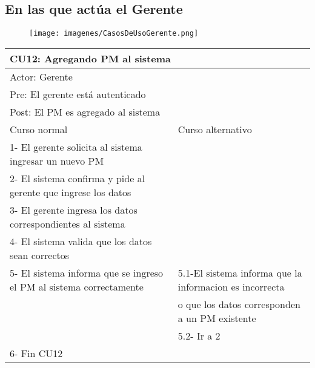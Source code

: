 \subsection{En las que actúa el Gerente}

\begin{figure}[H]
    \texttt{[image: imagenes/CasosDeUsoGerente.png]}
\end{figure}

\begin{table}[H]
  \begin{adjustbox}{max width = \textwidth}
  \begin{tabular}{|l|l|}
    \hline
    \multicolumn{2}{|l|}{CU12: Agregando PM al sistema} \\\hline
    \multicolumn{2}{|l|}{Actor: Gerente} \\\hline
    \multicolumn{2}{|l|}{Pre: El gerente está autenticado} \\\hline
    \multicolumn{2}{|l|}{Post: El PM es agregado al sistema} \\\hline
     Curso normal & Curso alternativo\\ \hline
	 1- El gerente solicita al sistema ingresar un nuevo PM & \\ \hline
     2- El sistema confirma y pide al gerente que ingrese los datos & \\ \hline
     3- El gerente ingresa los datos correspondientes al sistema & \\ \hline
     4- El sistema valida que los datos sean correctos & \\ \hline
     5- El sistema informa que se ingreso el PM al sistema correctamente & 5.1-El sistema informa que la informacion es incorrecta \\ & o que los datos corresponden a un PM existente  \\ & 5.2- Ir a 2 \\ \hline
     6- Fin CU12 & \\ \hline
  \end{tabular}
  \end{adjustbox}
\end{table}


